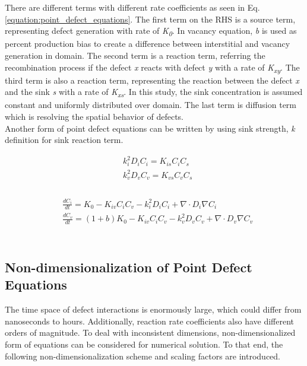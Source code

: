 \documentclass[utf8]{frontiersSCNS} %
\begin{document}
    There are different terms with different rate coefficients as seen in Eq. \ref{equation:point_defect_equations}. The first term on the RHS is a source term, representing defect generation with rate of \textit{K\textsubscript{0}}. In vacancy equation, \textit{b} is used as percent production bias to create a difference between interstitial and vacancy generation in domain. The second term is a reaction term, referring the recombination process if the defect \textit{x} reacts with defect \textit{y} with a rate of \textit{K\textsubscript{xy}}. The third term is also a reaction term, representing the reaction between the defect \textit{x} and the sink \textit{s} with a rate of \textit{K\textsubscript{xs}}. In this study, the sink concentration is assumed constant and uniformly distributed over domain. The last term is diffusion term which is resolving the spatial behavior of defects.\\
    Another form of point defect equations can be written by using sink strength, \textit{k} definition for sink reaction term.

\begin{equation}
  \begin{aligned}
    &k_i^2D_iC_i = K_{is}C_iC_s \\
    &k_v^2D_vC_v = K_{vs}C_vC_s \\
  \end{aligned}
  \label{equation:sink_reaction_term}
\end{equation}\\
\begin{equation}
  \begin{aligned}
    &\frac{dC_i}{dt} = K_0 - K_{iv}C_iC_v - k_i^2D_iC_i + \nabla\cdot D_i\nabla C_i\\
    &\frac{dC_v}{dt} = (1+b)K_0 - K_{iv}C_iC_v - k_v^2D_vC_v + \nabla\cdot D_v\nabla C_v\\
  \end{aligned}
  \label{equation:point_defect_equations_sink_strength}
\end{equation}\\

\subsection{Non-dimensionalization of Point Defect Equations}
    The time space of defect interactions is enormously large, which could differ from nanoseconds to hours. Additionally, reaction rate coefficients also have different orders of magnitude. To deal with inconsistent dimensions, non-dimensionalized form of equations can be considered for numerical solution. To that end, the following non-dimensionalization scheme and scaling factors are introduced.
\end{document}
